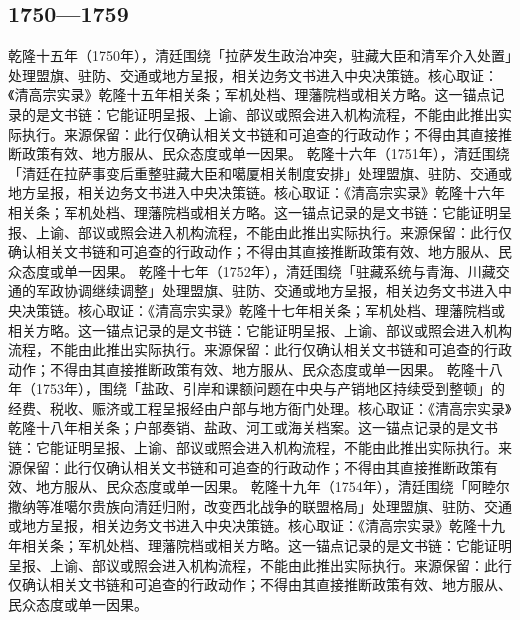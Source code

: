 \subsection{1750—1759}
乾隆十五年（1750年），清廷围绕「拉萨发生政治冲突，驻藏大臣和清军介入处置」处理盟旗、驻防、交通或地方呈报，相关边务文书进入中央决策链。核心取证：《清高宗实录》乾隆十五年相关条；军机处档、理藩院档或相关方略。这一锚点记录的是文书链：它能证明呈报、上谕、部议或照会进入机构流程，不能由此推出实际执行。来源保留：此行仅确认相关文书链和可追查的行政动作；不得由其直接推断政策有效、地方服从、民众态度或单一因果。
乾隆十六年（1751年），清廷围绕「清廷在拉萨事变后重整驻藏大臣和噶厦相关制度安排」处理盟旗、驻防、交通或地方呈报，相关边务文书进入中央决策链。核心取证：《清高宗实录》乾隆十六年相关条；军机处档、理藩院档或相关方略。这一锚点记录的是文书链：它能证明呈报、上谕、部议或照会进入机构流程，不能由此推出实际执行。来源保留：此行仅确认相关文书链和可追查的行政动作；不得由其直接推断政策有效、地方服从、民众态度或单一因果。
乾隆十七年（1752年），清廷围绕「驻藏系统与青海、川藏交通的军政协调继续调整」处理盟旗、驻防、交通或地方呈报，相关边务文书进入中央决策链。核心取证：《清高宗实录》乾隆十七年相关条；军机处档、理藩院档或相关方略。这一锚点记录的是文书链：它能证明呈报、上谕、部议或照会进入机构流程，不能由此推出实际执行。来源保留：此行仅确认相关文书链和可追查的行政动作；不得由其直接推断政策有效、地方服从、民众态度或单一因果。
乾隆十八年（1753年），围绕「盐政、引岸和课额问题在中央与产销地区持续受到整顿」的经费、税收、赈济或工程呈报经由户部与地方衙门处理。核心取证：《清高宗实录》乾隆十八年相关条；户部奏销、盐政、河工或海关档案。这一锚点记录的是文书链：它能证明呈报、上谕、部议或照会进入机构流程，不能由此推出实际执行。来源保留：此行仅确认相关文书链和可追查的行政动作；不得由其直接推断政策有效、地方服从、民众态度或单一因果。
乾隆十九年（1754年），清廷围绕「阿睦尔撒纳等准噶尔贵族向清廷归附，改变西北战争的联盟格局」处理盟旗、驻防、交通或地方呈报，相关边务文书进入中央决策链。核心取证：《清高宗实录》乾隆十九年相关条；军机处档、理藩院档或相关方略。这一锚点记录的是文书链：它能证明呈报、上谕、部议或照会进入机构流程，不能由此推出实际执行。来源保留：此行仅确认相关文书链和可追查的行政动作；不得由其直接推断政策有效、地方服从、民众态度或单一因果。
